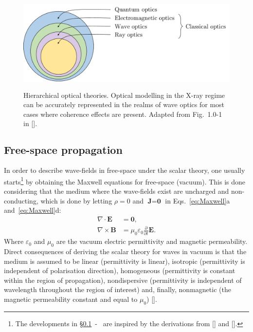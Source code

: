 \begin{refsection}
\begin{figure}[t]
    \centering
    {\includegraphics[width=.55\linewidth]{figures/ch02/optics.pdf}}
    \caption[Hierarchical optical theories]{Hierarchical optical theories. Optical modelling in the X-ray regime can be accurately represented in the realms of wave optics for most cases where coherence effects are present. Adapted from Fig.~1.0-1 in [\cite{Saleh2019}].}
    \label{fig:optical_theories}
\end{figure}

\subsection{Free-space propagation}\label{sec:free-space}

In order to describe wave-fields in free-space under the scalar theory, one usually starts\footnote{The developments in §\ref{sec:free-space}~-~\textit{} are inspired by the derivations from [\cite[\textit{§1}]{Paganin2006}] and [\cite[\textit{§3} \& \textit{§4}]{Goodman2017}].} by obtaining the Maxwell equations for free-space (vacuum). This is done considering that the medium where the wave-fields exist are uncharged and non-conducting, which is done by letting $\rho=0$ and $\textbf{J}=\textbf{0}$ in Eqs.~\ref{eq:Maxwell}a and~\ref{eq:Maxwell}d:
\begin{subequations}\label{eq:Maxwell_free}
    \begin{align}
        \nabla\cdot\textbf{E} &= \textbf{0},\\
        \nabla\times\textbf{B} &= \mu_0\varepsilon_0\frac{\partial}{\partial t}\textbf{E}.
    \end{align}
\end{subequations}{}
Where $\varepsilon_0$ and $\mu_0$ are the vacuum electric permittivity and magnetic permeability. Direct consequences of deriving the scalar theory for waves in vacuum is that the medium is assumed to be linear (permittivity is linear), isotropic (permittivity is independent of polarisation direction), homogeneous (permittivity is constant within the region of propagation), nondispersive (permittivity is independent of wavelength throughout the region of interest) and, finally, nonmagnetic (the magnetic permeability constant and equal to $\mu_0$) [\cite[\textit{§3.2}]{Goodman2017}]. 


\end{refsection}
